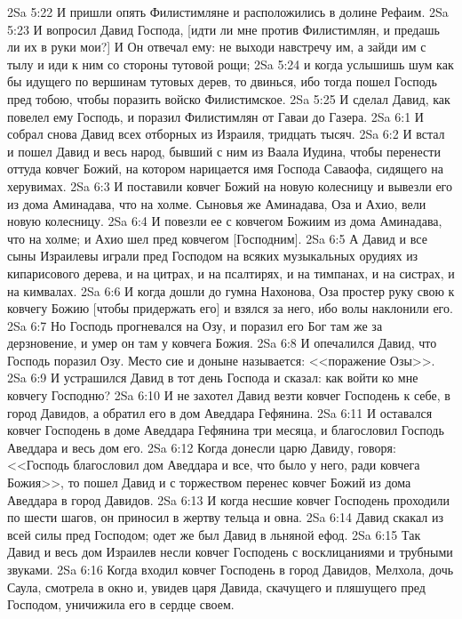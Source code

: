 \vs 2Sa 5:22 И пришли опять Филистимляне и расположились в долине Рефаим.
\vs 2Sa 5:23 И вопросил Давид Господа, [идти ли мне против Филистимлян, и предашь ли их в руки мои?] И Он отвечал ему: не выходи навстречу им, а зайди им с тылу и иди к ним со стороны тутовой рощи;
\vs 2Sa 5:24 и когда услышишь шум как бы идущего по вершинам тутовых дерев, то двинься, ибо тогда пошел Господь пред тобою, чтобы поразить войско Филистимское.
\vs 2Sa 5:25 И сделал Давид, как повелел ему Господь, и поразил Филистимлян от Гаваи до Газера.
\vs 2Sa 6:1 И собрал снова Давид всех отборных  из Израиля, тридцать тысяч.
\vs 2Sa 6:2 И встал и пошел Давид и весь народ, бывший с ним из Ваала Иудина, чтобы перенести оттуда ковчег Божий, на котором нарицается имя Господа Саваофа, сидящего на херувимах.
\vs 2Sa 6:3 И поставили ковчег Божий на новую колесницу и вывезли его из дома Аминадава, что на холме. Сыновья же Аминадава, Оза и Ахио, вели новую колесницу.
\vs 2Sa 6:4 И повезли ее с ковчегом Божиим из дома Аминадава, что на холме; и Ахио шел пред ковчегом [Господним].
\vs 2Sa 6:5 А Давид и все сыны Израилевы играли пред Господом на всяких музыкальных орудиях из кипарисового дерева, и на цитрах, и на псалтирях, и на тимпанах, и на систрах, и на кимвалах.
\vs 2Sa 6:6 И когда дошли до гумна Нахонова, Оза простер руку свою к ковчегу Божию [чтобы придержать его] и взялся за него, ибо волы наклонили его.
\vs 2Sa 6:7 Но Господь прогневался на Озу, и поразил его Бог там же за дерзновение, и умер он там у ковчега Божия.
\vs 2Sa 6:8 И опечалился Давид, что Господь поразил Озу. Место сие и доныне называется: <<поражение Озы>>.
\vs 2Sa 6:9 И устрашился Давид в тот день Господа и сказал: как войти ко мне ковчегу Господню?
\vs 2Sa 6:10 И не захотел Давид везти ковчег Господень к себе, в город Давидов, а обратил его в дом Аведдара Гефянина.
\vs 2Sa 6:11 И оставался ковчег Господень в доме Аведдара Гефянина три месяца, и благословил Господь Аведдара и весь дом его.
\vs 2Sa 6:12 Когда донесли царю Давиду, говоря: <<Господь благословил дом Аведдара и все, что было у него, ради ковчега Божия>>, то пошел Давид и с торжеством перенес ковчег Божий из дома Аведдара в город Давидов.
\vs 2Sa 6:13 И когда несшие ковчег Господень проходили по шести шагов, он приносил в жертву тельца и овна.
\vs 2Sa 6:14 Давид скакал из всей силы пред Господом; одет же был Давид в льняной ефод.
\vs 2Sa 6:15 Так Давид и весь дом Израилев несли ковчег Господень с восклицаниями и трубными звуками.
\rsbpar\vs 2Sa 6:16 Когда входил ковчег Господень в город Давидов, Мелхола, дочь Саула, смотрела в окно и, увидев царя Давида, скачущего и пляшущего пред Господом, уничижила его в сердце своем.
